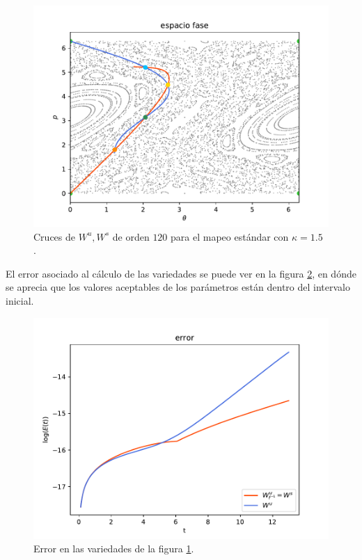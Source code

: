 \begin{figure}[H]
\centering
\includegraphics[scale=0.6]{cruce_estandar}
\caption{Cruces de $W^{u},W^{s}$ de orden $120$ para el mapeo estándar con $\kappa=1.5$ .}
\label{cruce_estandar}
\end{figure}
El error asociado al cálculo de las variedades se puede ver en la figura \ref{errorEstCruces}, en dónde se aprecia que los valores aceptables de los parámetros están dentro del intervalo inicial. 

\begin{figure}[H]
\centering
\includegraphics[scale=0.6]{error_cruces_estandar}
\caption{Error en las variedades de la figura \ref{cruce_estandar}.}
\label{errorEstCruces}
\end{figure}

